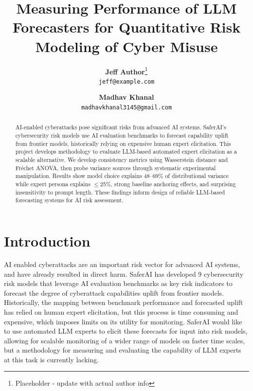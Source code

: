 \documentclass[midterm]{sparreport}
\title{Measuring Performance of LLM Forecasters for Quantitative Risk Modeling of Cyber Misuse}
\author{%
  \textbf{Jeff Author}\footnote{Placeholder - update with actual author info}\\
  \texttt{jeff@example.com}%
  \and
  \textbf{Madhav Khanal}\\
  \texttt{madhavkhanal3145@gmail.com}%
}
\begin{document}
\maketitle

\begin{abstract}
AI-enabled cyberattacks pose significant risks from advanced AI systems. SaferAI's cybersecurity risk models use AI evaluation benchmarks to forecast capability uplift from frontier models, historically relying on expensive human expert elicitation. This project develops methodology to evaluate LLM-based automated expert elicitation as a scalable alternative. We develop consistency metrics using Wasserstein distance and Fréchet ANOVA, then probe variance sources through systematic experimental manipulation. Results show model choice explains 48--69\% of distributional variance while expert persona explains $\leq$25\%, strong baseline anchoring effects, and surprising insensitivity to prompt length. These findings inform design of reliable LLM-based forecasting systems for AI risk assessment.
\end{abstract}


\section{Introduction}

AI enabled cyberattacks are an important risk vector for advanced AI systems, and have already resulted in direct harm. SaferAI has developed 9 cybersecurity risk models that leverage AI evaluation benchmarks as key risk indicators to forecast the degree of cyberattack capabilities uplift from frontier models. Historically, the mapping between benchmark performance and forecasted uplift has relied on human expert elicitation, but this process is time consuming and expensive, which imposes limits on its utility for monitoring. SaferAI would like to use automated LLM experts to elicit these forecasts for input into risk models, allowing for scalable monitoring of a wider range of models on faster time scales, but a methodology for measuring and evaluating the capability of LLM experts at this task is currently lacking.
\end{document}
